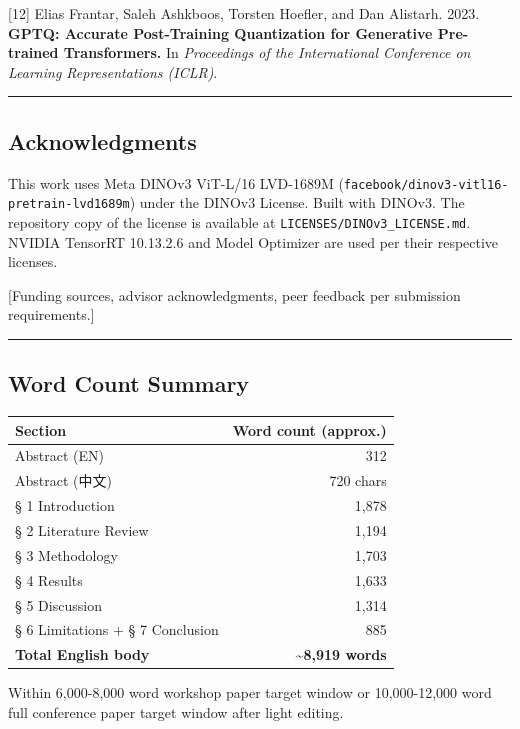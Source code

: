 \documentclass[
]{article}
\newcounter{none} %
\begin{document}
{[}12{]} Elias Frantar, Saleh Ashkboos, Torsten Hoefler, and Dan
Alistarh. 2023. \textbf{GPTQ: Accurate Post-Training Quantization for
Generative Pre-trained Transformers.} In \emph{Proceedings of the
International Conference on Learning Representations (ICLR)}.

\begin{center}\rule{0.5\linewidth}{0.5pt}\end{center}

\subsection{Acknowledgments}\label{acknowledgments}

This work uses Meta DINOv3 ViT-L/16 LVD-1689M
(\texttt{facebook/dinov3-vitl16-pretrain-lvd1689m}) under the DINOv3
License. Built with DINOv3. The repository copy of the license is
available at \texttt{LICENSES/DINOv3\_LICENSE.md}. NVIDIA TensorRT
10.13.2.6 and Model Optimizer are used per their respective licenses.

{[}Funding sources, advisor acknowledgments, peer feedback per
submission requirements.{]}

\begin{center}\rule{0.5\linewidth}{0.5pt}\end{center}

\subsection{Word Count Summary}\label{word-count-summary}

{\def\LTcaptype{none} %
\begin{longtable}[]{@{}lr@{}}
\toprule\noalign{}
Section & Word count (approx.) \\
\midrule\noalign{}
\endhead
\bottomrule\noalign{}
\endlastfoot
Abstract (EN) & 312 \\
Abstract (中文) & 720 chars \\
§ 1 Introduction & 1,878 \\
§ 2 Literature Review & 1,194 \\
§ 3 Methodology & 1,703 \\
§ 4 Results & 1,633 \\
§ 5 Discussion & 1,314 \\
§ 6 Limitations + § 7 Conclusion & 885 \\
\textbf{Total English body} & \textbf{\textasciitilde8,919 words} \\
\end{longtable}
}

Within 6,000-8,000 word workshop paper target window or 10,000-12,000
word full conference paper target window after light editing.
\end{document}
